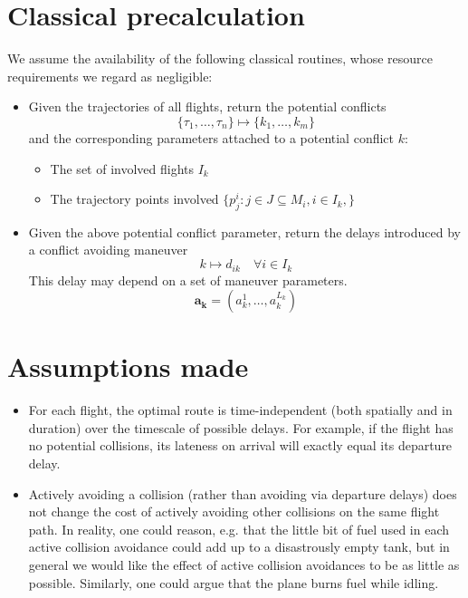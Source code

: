 \documentclass{article}
\begin{document}
\section{Classical precalculation}
\label{sec:classical_precalculation}
We assume the availability of the following classical routines, whose resource requirements we regard as negligible:
\begin{itemize}
\item Given the trajectories of all flights, return the potential conflicts
    \begin{equation*}
        \{\tau_1, \dots, \tau_n\} \mapsto \{k_1, \dots, k_m\}
    \end{equation*}
    and the corresponding parameters attached to a potential conflict $k$:
    \begin{itemize}
        \item The set of involved flights $I_k$
        \item The trajectory points involved $\{p^i_j : j\in J \subseteq M_i,  i \in I_k,\}$
    \end{itemize}
\item Given the above potential conflict parameter, return the delays introduced by a conflict avoiding maneuver
    \begin{equation*}
        k \mapsto d_{ik} \quad \forall i \in I_k 
    \end{equation*}
    This delay may depend on a set of maneuver parameters. 
    \begin{equation*}
        \mathbf{a_k} =  (a^1_k, \dots, a^{L_k}_k)
    \end{equation*}
\end{itemize}

\section{Assumptions made}
\begin{itemize}
\item For each flight, the optimal route is time-independent (both spatially and in duration) over the timescale of possible delays.
For example, if the flight has no potential collisions, its lateness on arrival will exactly equal its departure delay.
\item Actively avoiding a collision (rather than avoiding via departure delays) does not change the cost of actively avoiding other collisions on the same flight path. In reality, one could reason, e.g. that the little bit of fuel used in each active collision avoidance could add up to a disastrously empty tank, but in general we would like the effect of active collision avoidances to be as little as possible.
Similarly, one could argue that the plane burns fuel while idling.
\end{itemize}
\end{document}
